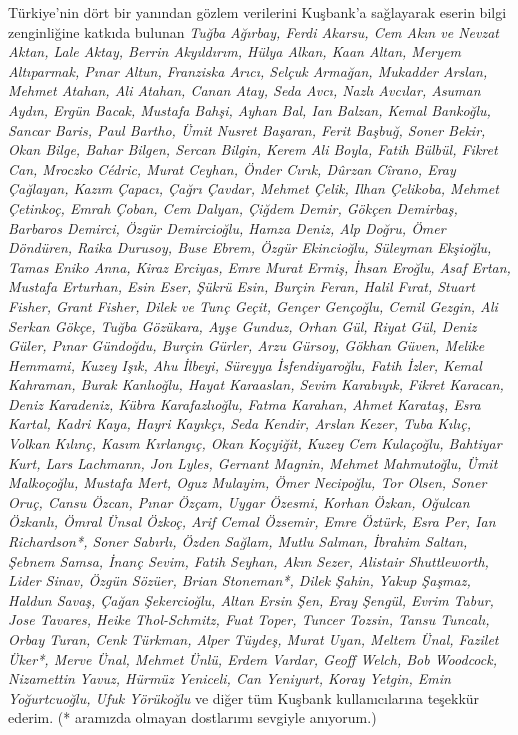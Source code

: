 \documentclass[
  a4paper,
  DIV=11,
  numbers=noendperiod]{scrreprt}
\begin{document}
Türkiye'nin dört bir yanından gözlem verilerini Kuşbank'a sağlayarak
eserin bilgi zenginliğine katkıda bulunan \emph{Tuğba Ağırbay, Ferdi
Akarsu, Cem Akın ve Nevzat Aktan, Lale Aktay, Berrin Akyıldırım, Hülya
Alkan, Kaan Altan, Meryem Altıparmak, Pınar Altun, Franziska Arıcı,
Selçuk Armağan, Mukadder Arslan, Mehmet Atahan, Ali Atahan, Canan Atay,
Seda Avcı, Nazlı Avcılar, Asuman Aydın, Ergün Bacak, Mustafa Bahşi,
Ayhan Bal, Ian Balzan, Kemal Bankoğlu, Sancar Baris, Paul Bartho, Ümit
Nusret Başaran, Ferit Başbuğ, Soner Bekir, Okan Bilge, Bahar Bilgen,
Sercan Bilgin, Kerem Ali Boyla, Fatih Bülbül, Fikret Can, Mroczko
Cédric, Murat Ceyhan, Önder Cırık, Dûrzan Cîrano, Eray Çağlayan, Kazım
Çapacı, Çağrı Çavdar, Mehmet Çelik, Ilhan Çelikoba, Mehmet Çetinkoç,
Emrah Çoban, Cem Dalyan, Çiğdem Demir, Gökçen Demirbaş, Barbaros
Demirci, Özgür Demircioğlu, Hamza Deniz, Alp Doğru, Ömer Döndüren, Raika
Durusoy, Buse Ebrem, Özgür Ekincioğlu, Süleyman Ekşioğlu, Tamas Eniko
Anna, Kiraz Erciyas, Emre Murat Ermiş, İhsan Eroğlu, Asaf Ertan, Mustafa
Erturhan, Esin Eser, Şükrü Esin, Burçin Feran, Halil Fırat, Stuart
Fisher, Grant Fisher, Dilek ve Tunç Geçit, Gençer Gençoğlu, Cemil
Gezgin, Ali Serkan Gökçe, Tuğba Gözükara, Ayşe Gunduz, Orhan Gül, Riyat
Gül, Deniz Güler, Pınar Gündoğdu, Burçin Gürler, Arzu Gürsoy, Gökhan
Güven, Melike Hemmami, Kuzey Işık, Ahu İlbeyi, Süreyya İsfendiyaroğlu,
Fatih İzler, Kemal Kahraman, Burak Kanlıoğlu, Hayat Karaaslan, Sevim
Karabıyık, Fikret Karacan, Deniz Karadeniz, Kübra Karafazlıoğlu, Fatma
Karahan, Ahmet Karataş, Esra Kartal, Kadri Kaya, Hayri Kayıkçı, Seda
Kendir, Arslan Kezer, Tuba Kılıç, Volkan Kılınç, Kasım Kırlangıç, Okan
Koçyiğit, Kuzey Cem Kulaçoğlu, Bahtiyar Kurt, Lars Lachmann, Jon Lyles,
Gernant Magnin, Mehmet Mahmutoğlu, Ümit} \emph{Malkoçoğlu, Mustafa Mert,
Oguz Mulayim, Ömer Necipoğlu, Tor Olsen, Soner Oruç, Cansu Özcan, Pınar
Özçam, Uygar Özesmi, Korhan Özkan, Oğulcan Özkanlı, Ömral Ünsal Özkoç,
Arif Cemal Özsemir, Emre Öztürk, Esra Per, Ian Richardson*, Soner
Sabırlı, Özden Sağlam, Mutlu Salman, İbrahim Saltan, Şebnem Samsa, İnanç
Sevim, Fatih Seyhan, Akın Sezer, Alistair Shuttleworth, Lider Sinav,
Özgün Sözüer, Brian Stoneman*, Dilek Şahin, Yakup Şaşmaz, Haldun Savaş,
Çağan Şekercioğlu, Altan Ersin Şen, Eray Şengül, Evrim Tabur, Jose
Tavares, Heike Thol-Schmitz, Fuat Toper, Tuncer Tozsin, Tansu Tuncalı,
Orbay Turan, Cenk Türkman, Alper Tüydeş, Murat Uyan, Meltem Ünal,
Fazilet Üker*, Merve Ünal, Mehmet Ünlü, Erdem Vardar, Geoff Welch, Bob
Woodcock, Nizamettin} \emph{Yavuz, Hürmüz Yeniceli, Can Yeniyurt, Koray
Yetgin, Emin Yoğurtcuoğlu, Ufuk Yörükoğlu} ve diğer tüm Kuşbank
kullanıcılarına teşekkür ederim. (* aramızda olmayan dostlarımı sevgiyle
anıyorum.)
\end{document}
